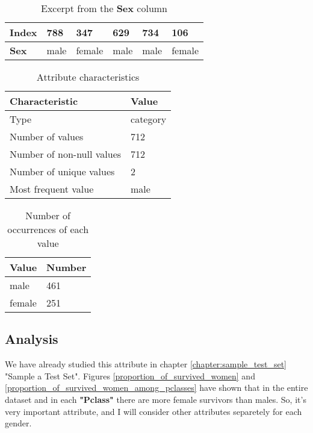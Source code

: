 \begin{table}[!ht]
    \centering
    \caption{Excerpt from the \textbf{Sex} column}
    \begin{tabular}{|l|l|l|l|l|l|}
        \hline
        \textbf{Index} & 788  & 347    & 629  & 734  & 106    \\ \hline
        \textbf{Sex}   & male & female & male & male & female \\ \hline
    \end{tabular}
    \label{table:excerpt_from_sex_column}
\end{table}

\begin{table}[!ht]
    \centering
    \caption{Attribute characteristics}
    \begin{tabular}{|l|l|}
        \hline
        \textbf{Characteristic}   & \textbf{Value} \\ \hline
        Type                      & category       \\ \hline
        Number of values          & 712            \\ \hline
        Number of non-null values & 712            \\ \hline
        Number of unique values   & 2              \\ \hline
        Most frequent value       & male           \\ \hline
    \end{tabular}
    \label{table:sex_characteristics}
\end{table}

\begin{table}[!ht]
    \centering
    \caption{Number of occurrences of each value}
    \begin{tabular}{|l|l|}
        \hline
        \textbf{Value}  & \textbf{Number} \\ \hline
        male            & 461             \\ \hline
        female          & 251             \\ \hline
    \end{tabular}
    \label{table:sex_value_counts}
\end{table}

\subsection{Analysis}
We have already studied this attribute in chapter \ref{chapter:sample_test_set}
"Sample a Test Set". Figures \ref{proportion_of_survived_women} and 
\ref{proportion_of_survived_women_among_pclasses} have shown that in the 
entire dataset and in each \textbf{"Pclass"} there are more female
survivors than males. So, it's very important attribute, and I will
consider other attributes separetely for each gender.

